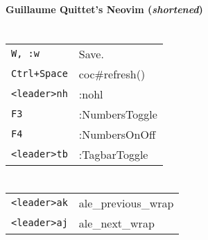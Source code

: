 




\raggedright
\footnotesize

\begin{center}
    \Huge{\textbf{Guillaume Quittet's Neovim (\textit{shortened})}} \\
\end{center}
\vspace*{0.5cm}

\begin{multicols}{3}


\setlength{\premulticols}{1pt}
\setlength{\postmulticols}{1pt}
\setlength{\multicolsep}{1pt}
\setlength{\columnsep}{2pt}

\section{}
\begin{tabular}{@{}ll@{}}
	\verb!W, :w! & Save. \\
	\verb!Ctrl+Space! & coc\#refresh()\\
    \verb!<leader>nh! & :nohl \\
    \verb!F3! & :NumbersToggle \\
    \verb!F4! & :NumbersOnOff \\
    \verb!<leader>tb! & :TagbarToggle \\
\end{tabular}

\section{}
\begin{tabular}{@{}ll@{}}
	\verb!<leader>ak! & ale\_previous\_wrap \\
	\verb!<leader>aj! & ale\_next\_wrap \\
\end{tabular}


\end{multicols}
